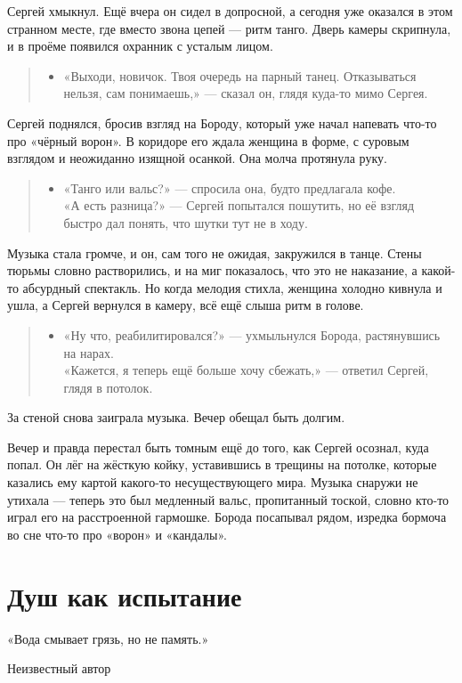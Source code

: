 \documentclass[12pt,a4paper]{book}
\newenvironment{dialogue}{\begin{quote}\itshape\begin{itemize}\item[]}{\end{itemize}\end{quote}}
\begin{document}
Сергей хмыкнул. Ещё вчера он сидел в допросной, а сегодня уже оказался в этом странном месте, где вместо звона цепей --- ритм танго. Дверь камеры скрипнула, и в проёме появился охранник с усталым лицом.

\begin{dialogue}
«Выходи, новичок. Твоя очередь на парный танец. Отказываться нельзя, сам понимаешь,» --- сказал он, глядя куда-то мимо Сергея.
\end{dialogue}

Сергей поднялся, бросив взгляд на Бороду, который уже начал напевать что-то про «чёрный ворон». В коридоре его ждала женщина в форме, с суровым взглядом и неожиданно изящной осанкой. Она молча протянула руку.

\begin{dialogue}
«Танго или вальс?» --- спросила она, будто предлагала кофе. \\
«А есть разница?» --- Сергей попытался пошутить, но её взгляд быстро дал понять, что шутки тут не в ходу.
\end{dialogue}

Музыка стала громче, и он, сам того не ожидая, закружился в танце. Стены тюрьмы словно растворились, и на миг показалось, что это не наказание, а какой-то абсурдный спектакль. Но когда мелодия стихла, женщина холодно кивнула и ушла, а Сергей вернулся в камеру, всё ещё слыша ритм в голове.

\begin{dialogue}
«Ну что, реабилитировался?» --- ухмыльнулся Борода, растянувшись на нарах. \\
«Кажется, я теперь ещё больше хочу сбежать,» --- ответил Сергей, глядя в потолок.
\end{dialogue}

За стеной снова заиграла музыка. Вечер обещал быть долгим.

Вечер и правда перестал быть томным ещё до того, как Сергей осознал, куда попал. Он лёг на жёсткую койку, уставившись в трещины на потолке, которые казались ему картой какого-то несуществующего мира. Музыка снаружи не утихала --- теперь это был медленный вальс, пропитанный тоской, словно кто-то играл его на расстроенной гармошке. Борода посапывал рядом, изредка бормоча во сне что-то про «ворон» и «кандалы».

\chapter{Душ как испытание}
\epigraph{«Вода смывает грязь, но не память.»}{Неизвестный автор}
\end{document}
